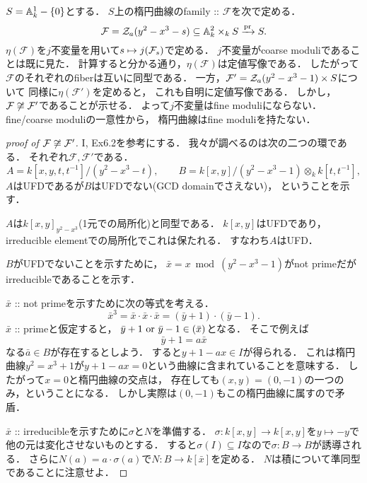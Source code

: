 \documentclass[a4paper]{jsarticle}
\newcommand{\famF}{\mathcal{F}}
\begin{document}
    $S=\mathbb{A}^1_k-\{0\}$とする．
    $S$上の楕円曲線のfamily :: $\famF$を次で定める．
    \[
        \famF=\zerosa(y^2-x^3-s) \subseteq \affine^2_k \times_k S
        \xrightarrow{\pr} S.
    \]
    $\eta(\famF)$を$j$不変量を用いて$s \mapsto j(\mathcal{F}_s)$で定める．
    $j$不変量がcoarse moduliであることは既に見た．
    計算すると分かる通り，$\eta(\famF)$は定値写像である．
    したがって$\famF$のそれぞれのfiberは互いに同型である．
    一方，$\famF'=\zerosa(y^2-x^3-1) \times S$について
    同様に$\eta(\famF')$を定めると，
    これも自明に定値写像である．
    しかし，$\famF \not \iso \famF'$であることが示せる．
    よって$j$不変量はfine moduliにならない．
    fine/coarse moduliの一意性から，
    楕円曲線はfine moduliを持たない．
    \begin{proof}[proof of $\famF \not \iso \famF'$]
        \cite{HarAG} I, Ex6.2を参考にする．
        我々が調べるのは次の二つの環である．
        それぞれ$\famF, \famF'$である．
        \[
            A=k[x,y, t,t^{-1}]/(y^2-x^3-t),
            \qquad
            B=k[x,y]/(y^2-x^3-1) \otimes_k k[t,t^{-1}],
        \]
        $A$はUFDであるが$B$はUFDでない(GCD domainでさえない)，
        ということを示す．

        $A$は$k[x,y]_{y^2-x^3}$(1元での局所化)と同型である．
        $k[x,y]$はUFDであり，irreducible elementでの局所化でこれは保たれる．
        すなわち$A$はUFD．

        $B$がUFDでないことを示すために，
        $\bar{x}=x \bmod (y^2-x^3-1)$がnot primeだがirreducibleであることを示す．

        $\bar{x}$ :: not primeを示すために次の等式を考える．
        \[ \bar{x}^3=\bar{x} \cdot \bar{x} \cdot \bar{x}=(\bar{y}+1) \cdot (\bar{y}-1). \]
        $\bar{x}$ :: primeと仮定すると，
        $\bar{y}+1 \text{ or } \bar{y}-1 \in (\bar{x})$となる．
        そこで例えば
        \[ \bar{y}+1=a \bar{x} \]
        なる$\bar{a} \in B$が存在するとしよう．
        すると$y+1-a x \in I$が得られる．
        これは楕円曲線$y^2=x^3+1$が$y+1-a x=0$という曲線に含まれていることを意味する．
        したがって$x=0$と楕円曲線の交点は，
        存在しても$(x,y)=(0,-1)$の一つのみ，ということになる．
        しかし実際は$(0,-1)$もこの楕円曲線に属すので矛盾．

        $\bar{x}$ :: irreducibleを示すために$\sigma$と$N$を準備する．
        $\sigma: k[x,y] \to k[x,y]$を$y \mapsto -y$で他の元は変化させないものとする．
        すると$\sigma(I) \subseteq I$なので$\sigma: B \to B$が誘導される．
        さらに$N(a)=a \cdot \sigma(a)$で$N: B \to k[\bar{x}]$を定める．
        $N$は積について準同型であることに注意せよ．


\end{proof}
\end{document}
